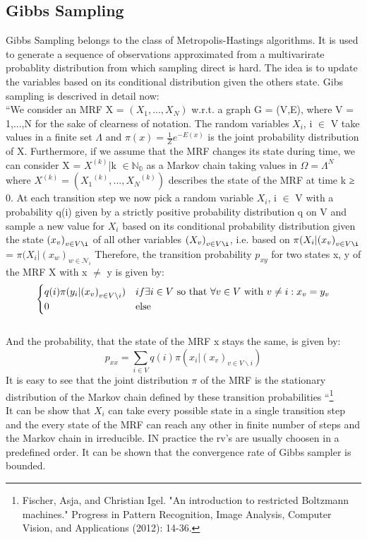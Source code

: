 \documentclass{article}
\begin{document}
\subsection{Gibbs Sampling}
Gibbs Sampling belongs to the class of Metropolis-Hastings algorithms. It is used to generate a sequence of observations approximated from a multivarirate probablity distribution from which sampling direct is hard. The idea is to update the variables based on its conditional distribution given the others state. Gibs sampling is descrived in detail now:
\\``We consider an MRF X = $(X_1,...,X_N )$ w.r.t. a graph G = (V,E), where V = {1,...,N} for the sake of clearness of notation. The random variables $X_i$, i $\in$ V take values in a finite set $\Lambda$ and $\pi(x) = \frac{1}{Z} e^{-E(x)}$ is the joint probability distribution of X. Furthermore, if we assume that the MRF changes its state during time, we can consider X = {$X^{(k)}$|k $\in \mathbb{N_0}$} as a Markov chain taking values in $\Omega = \Lambda^N$ where $X^{(k)} = ({X_1}^{(k)} ,...,{X_N}^{(k)} )$ describes the state of the MRF at time k ≥ 0. At each transition step we now pick a random variable $X_i$, i $\in$ V with a probability q(i) given by a strictly positive probability distribution q on V and sample a new value for $X_i$ based on its conditional probability distribution given the state ${(x_v)}_{v \in V\i} $ of all other variables ${(X_v)}_{v \in V\i} $, i.e. based on $\pi(X_{i}|{(x_v)}_{v \in V\i} $ = $\pi(X_{i}|{(x_w)}_{w \in \mathcal{N}_i} $ Therefore, the transition probability $p_{xy}$ for two states x, y of the MRF X with x $\neq$ y is given by:
\[ \begin{cases}
	 q(i) \pi(y_i|{(x_v)}_{v \in V \backslash i }) &  if \exists i \in V$ so that $\forall v \in V $ with $ v \neq i: x_v = y_v  \\
      0 & $else$ 
	\end{cases}
\]
\\And the probability, that the state of the MRF x stays the same, is given by:
\begin{equation}
p_{xx} = \sum_{i\in V}q(i) \pi(x_i|{(x_v)}_{v \in V \backslash i })
\end{equation}
It is easy to see that the joint distribution $\pi$ of the MRF is the stationary
distribution of the Markov chain defined by these transition probabilities ``\footnote{Fischer, Asja, and Christian Igel. "An introduction to restricted Boltzmann machines." Progress in Pattern Recognition, Image Analysis, Computer Vision, and Applications (2012): 14-36.}
\\It can be show that $X_i$ can take every possible state in a single transition step and the every state of the MRF can reach any other in finite number of steps and the Markov chain in irreducible. IN practice the rv's are usually choosen in a predefined order. It can be shown that the convergence rate of Gibbs sampler is bounded.
\end{document}
